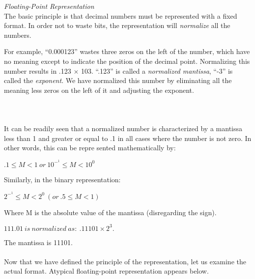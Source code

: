 \documentclass[12pt]{book}
\begin{document}
\noindent\textit{Floating-Point Representation}\\

The basic principle is that decimal numbers must be represented with a fixed format. In order not to waste bits, the representation will \textit{normalize} all the numbers.

For example, “0.000123” wastes three zeros on the left of the number, which have no meaning except to indicate the position of the decimal point. Normalizing this number results in .123 $\times$ 103. “.123” is called a \textit{normalized mantissa}, “-3” is called the \textit{exponent}. We have normalized this number by eliminating all the meaning less zeros on the left of it and adjusting the exponent.\\

\\

\\
\\

It can be readily seen that a normalized number is characterized by a mantissa less than 1 and greater or equal to .1 in all cases where the number is not zero. In other words, this can be repre sented mathematically by:
\begin{center}
$.1 \leqslant M < 1\ or\ 10^-^1 \leqslant M < 10^0$
\end{center}
Similarly, in the binary representation:
\begin{center}
$2^-^1 \leqslant M<2^0\ (or\ .5\leqslant M<1)$
\end{center}
Where M is the absolute value of the mantissa (disregarding the sign).\\

\begin{center}
$111.01\ is\ normalized\ as:\ .11101 \times 2^3.$
\end{center}
The mantissa is 11101.\\

\\

Now that we have defined the principle of the representation, let us examine the actual format. Atypical floating-point representation appears below.



\end{document}
